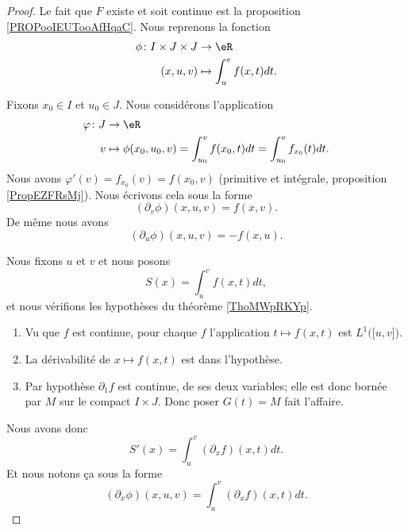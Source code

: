\begin{proof}
	Le fait que \( F\) existe et soit continue est la proposition \ref{PROPooIEUTooAfHqaC}. Nous reprenons la fonction
	\begin{equation}
		\begin{aligned}
			\phi\colon I\times J\times J & \to \eR                   \\
			(x,u,v)                      & \mapsto \int_u^vf(x,t)dt.
		\end{aligned}
	\end{equation}

	Fixons \( x_0\in I\) et \( u_0\in J\). Nous considérons l'application
	\begin{equation}
		\begin{aligned}
			\varphi\colon J & \to \eR                                                                  \\
			v               & \mapsto \phi(x_0,u_0,v)=\int_{u_0}^vf(x_0,t)dt=\int_{u_0}^vf_{x_0}(t)dt.
		\end{aligned}
	\end{equation}
	Nous avons \( \varphi'(v)=f_{x_0}(v)=f(x_0,v)\) (primitive et intégrale, proposition \ref{PropEZFRsMj}). Nous écrivons cela sous la forme
	\begin{equation}
		(\partial_v\phi)(x,u,v)=f(x,v).
	\end{equation}
	De même nous avons
	\begin{equation}
		(\partial_u\phi)(x,u,v)=-f(x,u).
	\end{equation}

	Nous fixons \( u\) et \( v\) et nous posons
	\begin{equation}
		S(x)=\int_u^vf(x,t)dt,
	\end{equation}
	et nous vérifions les hypothèses du théorème \ref{ThoMWpRKYp}.
	\begin{enumerate}
		\item
		      Vu que \( f\) est continue, pour chaque \( f\) l'application \( t\mapsto f(x,t)\) est \( L^1\big( \mathopen[ u,v\mathclose] \big)\).
		\item
		      La dérivabilité de \( x\mapsto f(x,t)\) est dans l'hypothèse.
		\item
		      Par hypothèse \( \partial_1f\) est continue, de ses deux variables; elle est donc bornée par \( M\) sur le compact \( I\times J\). Donc poser \( G(t)=M\) fait l'affaire.
	\end{enumerate}
	Nous avons donc
	\begin{equation}
		S'(x)=\int_u^v(\partial_xf)(x,t)dt.
	\end{equation}
	Et nous notons ça sous la forme
	\begin{equation}
		(\partial_x\phi)(x,u,v)=\int_u^v(\partial_xf)(x,t)dt.
	\end{equation}


\end{proof}
